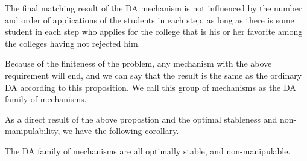 \begin{prop}
 The final
matching result of the DA mechanism is not influenced by the number and order of applications of the students in each step, as long as there is some student in each step  who applies for the college that is his or her favorite among the colleges having not rejected him.
\end{prop}

Because of the finiteness of the problem, any mechanism with the above requirement will end, and we can say that the result is the same as the ordinary DA according to this  proposition. 
We call this group of mechanisms as the DA family of mechanisms.

As a direct result of the above propostion and the optimal stableness and non-manipulability, we have the following corollary.

\begin{corollary}
The DA family of mechanisms are all optimally stable, and non-manipulable.
\end{corollary}

